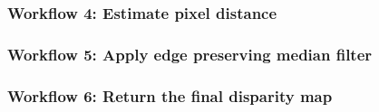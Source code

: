 \documentclass[19pt]{beamer}
\begin{document}
\begin{frame}
\frametitle{Workflow 4: Estimate pixel distance}
\end{frame}


\begin{frame}
\frametitle{Workflow 5: Apply edge preserving median filter}
\end{frame}


\begin{frame}
\frametitle{Workflow 6: Return the final disparity map}
\end{frame}
\end{document}
